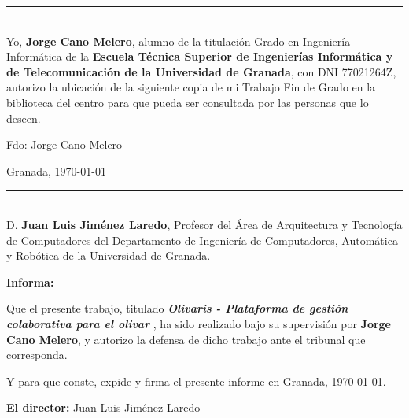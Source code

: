 \newpage \thispagestyle{empty} \mbox{} \newpage
\vspace{5cm}
\noindent\rule[-1ex]{\textwidth}{2pt}\\[4.5ex]

Yo, \textbf{Jorge Cano Melero}, alumno de la titulación Grado en Ingeniería Informática de la \textbf{Escuela Técnica Superior
de Ingenierías Informática y de Telecomunicación de la Universidad de Granada}, con DNI 77021264Z, autorizo la ubicación de la siguiente copia de mi Trabajo Fin de Grado en la biblioteca del centro para que pueda ser
consultada por las personas que lo deseen.

\vspace{6cm}

\noindent Fdo: Jorge Cano Melero

\vspace{2cm}

\begin{flushright}
Granada, \today
\end{flushright}

\newpage \thispagestyle{empty} \mbox{} \newpage

\newpage
\vspace{5cm}
\noindent\rule[-1ex]{\textwidth}{2pt}\\[4.5ex]

D. \textbf{Juan Luis Jiménez Laredo}, Profesor del Área de Arquitectura y Tecnología de Computadores
del Departamento de Ingeniería de Computadores, Automática y Robótica de la Universidad de Granada.

\vspace{0.5cm}

\textbf{Informa:}

\vspace{0.5cm}

Que el presente trabajo, titulado \textit{\textbf{ Olivaris - Plataforma de gestión colaborativa para el olivar }}, ha sido realizado bajo su supervisión por \textbf{Jorge Cano Melero}, y autorizo la defensa de dicho trabajo ante el tribunal que corresponda.

\vspace{0.5cm}

Y para que conste, expide y firma el presente informe en Granada, \today.

\vspace{1cm}

\textbf{El director:} Juan Luis Jiménez Laredo

\newpage \thispagestyle{empty} \mbox{} \newpage